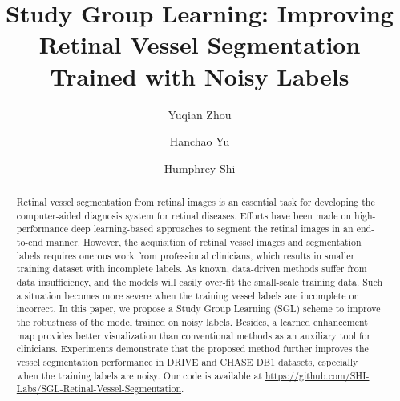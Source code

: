 \documentclass[runningheads]{llncs}
\begin{document}
\title{Study Group Learning: Improving Retinal Vessel Segmentation Trained with Noisy Labels }
\author{Yuqian Zhou \and
Hanchao Yu\and
Humphrey Shi}



\maketitle              \begin{abstract}
Retinal vessel segmentation from retinal images is an essential task for developing the computer-aided diagnosis system for retinal diseases. Efforts have been made on high-performance deep learning-based approaches to segment the retinal images in an end-to-end manner. However, the acquisition of retinal vessel images and segmentation labels requires onerous work from professional clinicians, which results in smaller training dataset with incomplete labels. As known, data-driven methods suffer from data insufficiency, and the models will easily over-fit the small-scale training data. Such a situation becomes more severe when the training vessel labels are incomplete or incorrect. In this paper, we propose a Study Group Learning (SGL) scheme to improve the robustness of the model trained on noisy labels. Besides, a learned enhancement map provides better visualization than conventional methods as an auxiliary tool for clinicians. Experiments demonstrate that the proposed method further improves the vessel segmentation performance in DRIVE and CHASE$\_$DB1 datasets, especially when the training labels are noisy. Our code is available at {\color{magenta} \url{https://github.com/SHI-Labs/SGL-Retinal-Vessel-Segmentation}}.

\end{abstract}
\end{document}
